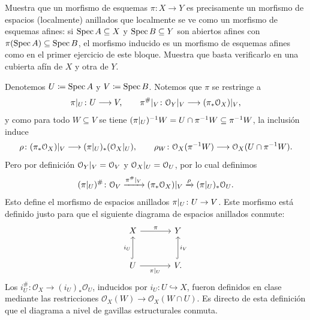 \begin{ejer}\label{ejer:t3-morfismo-local-afines}
Muestra que un morfismo de esquemas $\pi\colon X\to Y$ es precisamente un morfismo de espacios (localmente) anillados que localmente se ve como un morfismo de esquemas afines: si $\operatorname{Spec} A\subseteq X$ y $\operatorname{Spec} B\subseteq Y$ son abiertos afines con $\pi(\operatorname{Spec} A)\subseteq\operatorname{Spec} B$, el morfismo inducido es un morfismo de esquemas afines como en el primer ejercicio de este bloque. Muestra que basta verificarlo en una cubierta afín de $X$ y otra de $Y$.
\end{ejer}
\begin{sol}
Denotemos $U\coloneq\operatorname{Spec} A$ y $V\coloneq\operatorname{Spec} B$. Notemos que $\pi$ se restringe a
\[
\restr{\pi}{U}\colon U\longrightarrow V,
\qquad\restr{\pi^\#}{V}\colon\restr{\mathcal O_Y}{V}\longrightarrow\restr{(\pi_*\mathcal O_X)}{V},
\]
y como para todo $W\subseteq V$ se tiene $(\restr{\pi}{U})^{-1}W=U\cap\pi^{-1}W\subseteq\pi^{-1}W$, la inclusión induce
\[
\rho\colon\restr{(\pi_*\mathcal O_X)}{V}
\longrightarrow(\restr{\pi}{U})_*(\restr{\mathcal O_X}{U}),
\qquad
\rho_W\colon\mathcal O_X(\pi^{-1}W)\longrightarrow\mathcal O_X(U\cap\pi^{-1}W).
\]
Pero por definición $\restr{\mathcal O_Y}{V}=\mathcal O_V$ y $\restr{\mathcal O_X}{U}=\mathcal O_U$, por lo cual definimos
\[
(\restr{\pi}{U})^\#\colon
\mathcal O_V\xrightarrow{\restr{\pi^\#}{V}}\restr{(\pi_*\mathcal O_X)}{V}
\xrightarrow{\rho}(\restr{\pi}{U})_*\mathcal O_U.
\]
Esto define el morfismo de espacios anillados $\restr{\pi}{U}\colon U\to V$. Este morfismo está definido justo para que el siguiente diagrama de espacios anillados conmute:
\[
\begin{tikzcd}[column sep=large,row sep=large]
X\arrow[r,"\pi"]&Y\\
U\arrow[u,hook,"i_U"]\arrow[r,"\restr{\pi}{U}"']&V\arrow[u,hook,"i_V"'].
\end{tikzcd}
\]
Los $i_U^\#\colon\mathcal O_X\to(i_U)_*\mathcal O_U$, inducidos por $i_U\colon U\hookrightarrow X$, fueron definidos en clase mediante las restricciones $\mathcal O_X(W)\to\mathcal O_X(W\cap U)$. Es directo de esta definición que el diagrama a nivel de gavillas estructurales conmuta.


\end{sol}
